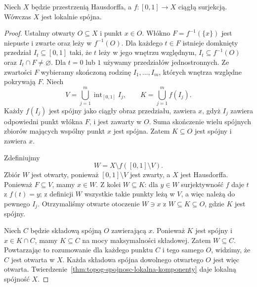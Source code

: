 \begin{lemat}
\label{lem:topog26-image-locally-connected}
Niech \(X\) będzie przestrzenią
Hausdorffa, a
\(f\colon[0,1]\to X\)
ciągłą surjekcją.
Wówczas \(X\) jest lokalnie spójna.
\end{lemat}
\begin{proof}
Ustalmy otwarty \(O\subseteq X\)
i punkt \(x\in O\).
Włókno
\(F=f^{-1}(\{x\})\)
jest niepuste i zwarte
oraz leży w \(f^{-1}(O)\).
Dla każdego \(t\in F\)
istnieje domknięty przedział
\(I_t\subseteq[0,1]\)
taki, że \(t\) leży w jego
wnętrzu względnym,
\(I_t\subseteq f^{-1}(O)\)
oraz \(I_t\cap F\neq\varnothing\).
Dla \(t=0\) lub \(1\)
używamy przedziałów jednostronnych.
Ze zwartości \(F\)
wybieramy skończoną
rodzinę \(I_1,\ldots,I_m\),
których wnętrza względne
pokrywają \(F\).
Niech
\[
 V=\bigcup_{j=1}^{m}\operatorname{int}_{[0,1]}I_j,
 \qquad K=\bigcup_{j=1}^{m}f(I_j).
\]
Każdy \(f(I_j)\) jest
spójny jako ciągły obraz
przedziału, zawiera \(x\),
gdyż \(I_j\) zawiera
odpowiedni punkt włókna \(F\),
i jest zawarty w \(O\).
Suma skończenie wielu
spójnych zbiorów mających
wspólny punkt \(x\)
jest spójna. Zatem
\(K\subseteq O\)
jest spójny i zawiera \(x\).

Zdefiniujmy
\[
 W=X\setminus f([0,1]\setminus V).
\]
Zbiór \(W\) jest otwarty,
ponieważ \([0,1]\setminus V\)
jest zwarty, a \(X\)
jest Hausdorffa.
Ponieważ \(F\subseteq V\),
mamy \(x\in W\).
Z kolei \(W\subseteq K\):
dla \(y\in W\) surjektywność
\(f\) daje \(t\) z \(f(t)=y\);
z definicji \(W\) wszystkie
takie punkty leżą w \(V\),
a więc należą do pewnego \(I_j\).
Otrzymaliśmy otwarte
otoczenie \(W\ni x\)
z \(W\subseteq K\subseteq O\),
gdzie \(K\) jest spójny.

Niech \(C\) będzie składową
spójną \(O\) zawierającą \(x\).
Ponieważ \(K\) jest spójny
i \(x\in K\cap C\),
mamy \(K\subseteq C\)
na mocy maksymalności składowej.
Zatem \(W\subseteq C\).
Powtarzając to rozumowanie
dla każdego punktu \(C\)
i tego samego \(O\),
widzimy, że \(C\)
jest otwarta w \(X\).
Każda składowa spójna
dowolnego otwartego \(O\)
jest więc otwarta.
Twierdzenie~\ref{thm:topog-spojnosc-lokalna-komponenty}
daje lokalną spójność \(X\).
\end{proof}

